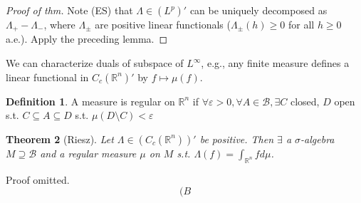 \documentclass{article}
\theoremstyle{definition}
\newtheorem{defn}{Definition}[section]
\theoremstyle{remark}
\theoremstyle{plain}
\newtheorem{thm}[defn]{Theorem}
\newcommand{\RR}{\mathbb{R}}
\begin{document}
\begin{proof}[Proof of thm]
    Note (ES) that $\Lambda\in (L^p)'$ can be uniquely decomposed as $\Lambda_+-\Lambda_-$, where $\Lambda_\pm$ are positive linear functionals ($\Lambda_\pm(h)\ge 0$ for all $h\ge 0$ a.e.). Apply the preceding lemma.
\end{proof}

We can characterize duals of subspace of $L^\infty$, e.g., any finite measure defines a linear functional in $C_c(\RR^n)'$ by $f\mapsto \mu(f)$.

\begin{defn}
    A measure is regular on $\RR^n$ if $\forall\varepsilon>0,\forall A\in\mathcal B,\exists C$ closed, $D$ open s.t. $C\subseteq A\subseteq D$ s.t. $\mu(D\setminus C)<\varepsilon$
\end{defn}
\begin{thm}[Riesz]
    Let $\Lambda\in (C_c(\RR^n))'$ be positive. Then $\exists$ a $\sigma$-algebra $M\supseteq\mathcal B$ and a regular measure $\mu$ on $M$ s.t. $\Lambda(f)=\int_{\RR^n}fd\mu$.
\end{thm}
Proof omitted.
\[(B\tag{Owen's Signature}\]
\end{document}
